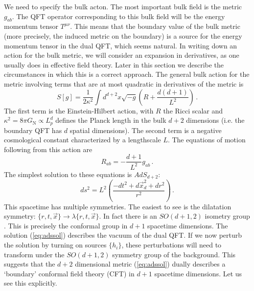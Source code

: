 \documentclass[10pt, oneside]{book}
\def\be{\begin{equation}}
\def\ee{\end{equation}}
\begin{document}
\begin{doublespace}
We need to specify the bulk acton. The most important bulk field is the metric $g_{ab}$. The QFT operator corresponding to this bulk field will be the energy momentum tensor $T^{\mu\nu}$. This means that the boundary value of the bulk metric (more precisely, the induced metric on the boundary) is a source for the energy momentum tensor in the dual QFT, which seems natural. In writing down an action for the bulk metric, we will consider an expansion in derivatives, as one usually does in effective field theory. Later in this section we describe the circumstances in which this is a correct approach. The general bulk action for the metric involving terms that are at most quadratic in derivatives of the metric is
\be\label{eq:EH}
S[g] = \frac{1}{2 \kappa^2} \int d^{d+2}x \sqrt{-g} \left(R + \frac{d(d+1)}{L^2} \right) \,.
\ee
The first term is the Einstein-Hilbert action, with $R$ the Ricci scalar and $\kappa^2 = 8\pi G_{\mathrm{N}} \propto L_p^{d}$ defines the Planck length in the bulk $d+2$ dimensions (i.e. the boundary QFT has $d$ spatial dimensions). The second term is a negative cosmological constant characterized by a lengthscale $L$. The equations of motion following from this action are
\be\label{eq:vacE}
R_{ab} = - \frac{d+1}{L^2} g_{ab} \,.
\ee
The simplest solution to these equations is $AdS_{d+2}$:
\be\label{eq:adssol}
ds^2 = L^2 \left( \frac{-dt^2 + d\vec x_{d}^2 + dr^2}{r^2} \right) \,.
\ee
This spacetime has multiple symmetries. The easiest to see is the dilatation symmetry: $\{r,t,\vec x\} \to \lambda \{r,t,\vec x\}$. In fact there is an $SO(d+1,2)$ isometry group \cite{Aharony:1999ti}. This is precisely the conformal group in $d+1$ spacetime dimensions. The solution (\ref{eq:adssol}) describes the vacuum of the dual QFT. If we now perturb the solution by turning on sources $\{h_i\}$, these perturbations will need to transform under the $SO(d+1,2)$ symmetry group of the background. This suggests that the $d+2$ dimensional metric (\ref{eq:adssol}) dually describes a `boundary' conformal field theory (CFT) in $d+1$ spacetime dimensions. Let us see this explicitly.


\end{doublespace}
\end{document}
